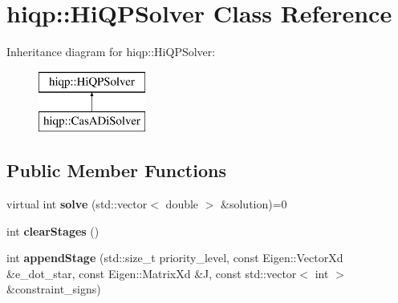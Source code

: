 \hypertarget{classhiqp_1_1HiQPSolver}{\section{hiqp\-:\-:Hi\-Q\-P\-Solver Class Reference}
\label{classhiqp_1_1HiQPSolver}
}
Inheritance diagram for hiqp\-:\-:Hi\-Q\-P\-Solver\-:\begin{figure}[H]
\begin{center}
\leavevmode
\includegraphics[height=2.000000cm]{classhiqp_1_1HiQPSolver}
\end{center}
\end{figure}
\subsection*{Public Member Functions}
\begin{DoxyCompactItemize}
\item 
\hypertarget{classhiqp_1_1HiQPSolver_a09b7d82d890a6de7ca23e4855b4597eb}{virtual int {\bfseries solve} (std\-::vector$<$ double $>$ \&solution)=0}\label{classhiqp_1_1HiQPSolver_a09b7d82d890a6de7ca23e4855b4597eb}

\item 
\hypertarget{classhiqp_1_1HiQPSolver_a81bbc8e84c926e64e50ad5d00ed1bd8d}{int {\bfseries clear\-Stages} ()}\label{classhiqp_1_1HiQPSolver_a81bbc8e84c926e64e50ad5d00ed1bd8d}

\item 
\hypertarget{classhiqp_1_1HiQPSolver_a70dbef1f94e10737a9e053a260f88533}{int {\bfseries append\-Stage} (std\-::size\-\_\-t priority\-\_\-level, const Eigen\-::\-Vector\-Xd \&e\-\_\-dot\-\_\-star, const Eigen\-::\-Matrix\-Xd \&J, const std\-::vector$<$ int $>$ \&constraint\-\_\-signs)}\label{classhiqp_1_1HiQPSolver_a70dbef1f94e10737a9e053a260f88533}

\end{DoxyCompactItemize}
